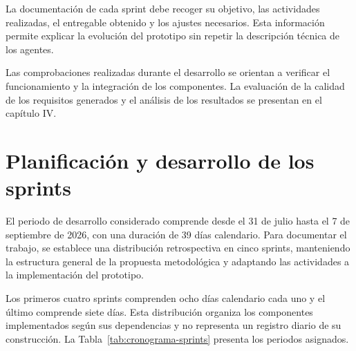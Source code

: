 La documentación de cada sprint debe recoger su objetivo,
las actividades realizadas, el entregable obtenido y
los ajustes necesarios. Esta información permite
explicar la evolución del prototipo sin repetir
la descripción técnica de los agentes.

Las comprobaciones realizadas durante el desarrollo
se orientan a verificar el funcionamiento y la
integración de los componentes. La evaluación de
la calidad de los requisitos generados y el análisis
de los resultados se presentan en el capítulo IV.


\section{Planificación y desarrollo de los sprints}

El periodo de desarrollo considerado comprende desde
el 31 de julio hasta el 7 de septiembre de 2026,
con una duración de 39 días calendario. Para documentar
el trabajo, se establece una distribución retrospectiva
en cinco sprints, manteniendo la estructura general
de la propuesta metodológica y adaptando las actividades
a la implementación del prototipo.

Los primeros cuatro sprints comprenden ocho días
calendario cada uno y el último comprende siete días.
Esta distribución organiza los componentes implementados
según sus dependencias y no representa un registro
diario de su construcción. La
Tabla~\ref{tab:cronograma-sprints} presenta los periodos
asignados.

